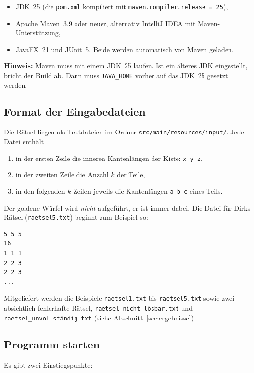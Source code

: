 \documentclass[11pt,a4paper,parskip=half]{scrartcl}
\newcommand{\code}[1]{\texttt{#1}}
\newcommand{\file}[1]{\texttt{#1}}
\begin{document}
\begin{itemize}
  \item JDK~25 (die \file{pom.xml} kompiliert mit \code{maven.compiler.release = 25}),
  \item Apache Maven~3.9 oder neuer, alternativ IntelliJ IDEA mit Maven-Unterstützung,
  \item JavaFX~21 und JUnit~5. Beide werden automatisch von Maven geladen.
\end{itemize}

\textbf{Hinweis:} Maven muss mit einem JDK~25 laufen. Ist ein älteres JDK
eingestellt, bricht der Build ab. Dann muss \code{JAVA\_HOME} vorher auf das JDK~25
gesetzt werden.

\subsection{Format der Eingabedateien}

Die Rätsel liegen als Textdateien im Ordner \file{src/main/resources/input/}. Jede
Datei enthält
\begin{enumerate}
  \item in der ersten Zeile die inneren Kantenlängen der Kiste: \code{x y z},
  \item in der zweiten Zeile die Anzahl $k$ der Teile,
  \item in den folgenden $k$ Zeilen jeweils die Kantenlängen \code{a b c} eines Teils.
\end{enumerate}
Der goldene Würfel wird \emph{nicht} aufgeführt, er ist immer dabei. Die Datei für
Dirks Rätsel (\file{raetsel5.txt}) beginnt zum Beispiel so:

\begin{lstlisting}
5 5 5
16
1 1 1
2 2 3
2 2 3
...
\end{lstlisting}

Mitgeliefert werden die Beispiele \file{raetsel1.txt} bis \file{raetsel5.txt} sowie
zwei absichtlich fehlerhafte Rätsel, \file{raetsel\_nicht\_lösbar.txt} und
\file{raetsel\_unvollständig.txt} (siehe Abschnitt~\ref{sec:ergebnisse}).

\subsection{Programm starten}

Es gibt zwei Einstiegspunkte:
\end{document}
